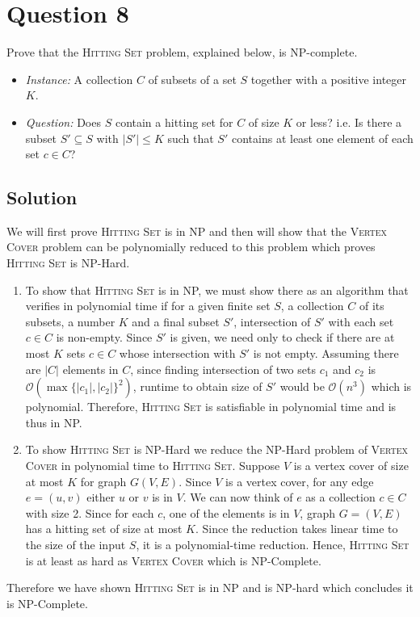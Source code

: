
\section*{Question 8}

Prove that the \textsc{Hitting Set} problem, explained below, is NP-complete.
\begin{itemize}\itemsep=0pt
\item[] \textit{Instance:} A collection $C$ of subsets of a set $S$ together with a positive integer $K$.
\item[] \textit{Question:} Does $S$ contain a hitting set for $C$ of size $K$ or less? i.e. Is there a subset $S' \subseteq S$ with $|S'| \leq K$ such that $S'$ contains at least one element of each set $c \in C$? 
\end{itemize}
\subsection*{Solution}
We will first prove \textsc{Hitting Set} is in NP and then will show that the \textsc{Vertex Cover} problem can be polynomially reduced to this problem which proves \textsc{Hitting Set} is NP-Hard.
\begin{enumerate}[label=(\alph*)]
\item To show that \textsc{Hitting Set} is in NP, we must show there as an algorithm that verifies in polynomial time if for a given finite set $S$, a collection $C$ of its subsets, a number $K$ and a final subset $S'$, intersection of $S'$ with each set $c \in C$ is non-empty.
Since $S'$ is given, we need only to check if there are at most $K$ sets $c \in C$ whose intersection with $S'$ is not empty. Assuming there are $|C|$ elements in $C$, since finding intersection of two sets $c_1$ and $c_2$ is $\mathcal{O}(\max\{|c_1|, |c_2|\}^2)$, runtime to obtain size of $S'$ would be $\mathcal{O}(n^3)$ which is polynomial. Therefore, \textsc{Hitting Set} is satisfiable in polynomial time and is thus in NP.
\item To show \textsc{Hitting Set} is NP-Hard we reduce the NP-Hard problem of \textsc{Vertex Cover} in polynomial time to \textsc{Hitting Set}. Suppose $V$ is a vertex cover of size at most $K$ for graph $G(V, E)$. Since $V$ is a vertex cover, for any edge $e = (u,v)$ either $u$ or $v$ is in $V$. We can now think of $e$ as a collection $c \in C$ with size 2. Since for each $c$, one of the elements is in $V$, graph $G=(V,E)$ has a hitting set of size at most $K$.
Since the reduction takes linear time to the size of the input $S$, it is a polynomial-time reduction. Hence, \textsc{Hitting Set} is at least as hard as \textsc{Vertex Cover} which is NP-Complete.
\end{enumerate}
Therefore we have shown \textsc{Hitting Set} is in NP and is NP-hard which concludes it is NP-Complete.
